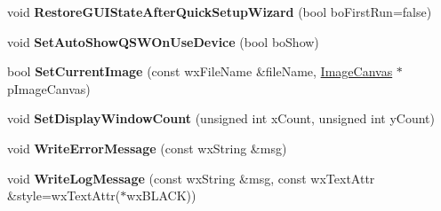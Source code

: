 \begin{DoxyCompactItemize}
\item 
\hypertarget{class_prop_view_frame_a808e2be1cc3e602965bc450c3266922c}{void {\bfseries Restore\+G\+U\+I\+State\+After\+Quick\+Setup\+Wizard} (bool bo\+First\+Run=false)}\label{class_prop_view_frame_a808e2be1cc3e602965bc450c3266922c}

\item 
\hypertarget{class_prop_view_frame_a46640402fa056f0c9f81d0024a7dbe18}{void {\bfseries Set\+Auto\+Show\+Q\+S\+W\+On\+Use\+Device} (bool bo\+Show)}\label{class_prop_view_frame_a46640402fa056f0c9f81d0024a7dbe18}

\item 
\hypertarget{class_prop_view_frame_ac90d87188c6956c3a7da4fa8538a4889}{bool {\bfseries Set\+Current\+Image} (const wx\+File\+Name \&file\+Name, \hyperlink{class_image_canvas}{Image\+Canvas} $\ast$p\+Image\+Canvas)}\label{class_prop_view_frame_ac90d87188c6956c3a7da4fa8538a4889}

\item 
\hypertarget{class_prop_view_frame_a6c6dd842ee6fc7d818746fb564cc96b9}{void {\bfseries Set\+Display\+Window\+Count} (unsigned int x\+Count, unsigned int y\+Count)}\label{class_prop_view_frame_a6c6dd842ee6fc7d818746fb564cc96b9}

\item 
\hypertarget{class_prop_view_frame_afea3a7454c53317bd696efdec17d76a9}{void {\bfseries Write\+Error\+Message} (const wx\+String \&msg)}\label{class_prop_view_frame_afea3a7454c53317bd696efdec17d76a9}

\item 
\hypertarget{class_prop_view_frame_a047967db8aa587d480999f873077e2ea}{void {\bfseries Write\+Log\+Message} (const wx\+String \&msg, const wx\+Text\+Attr \&style=wx\+Text\+Attr($\ast$wx\+B\+L\+A\+C\+K))}\label{class_prop_view_frame_a047967db8aa587d480999f873077e2ea}

\end{DoxyCompactItemize}
